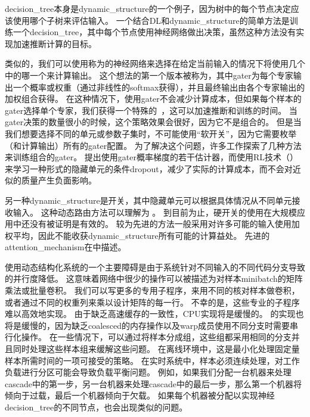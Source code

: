 \gls{decision_tree}本身是\gls{dynamic_structure}的一个例子，因为树中的每个节点决定应该使用哪个子树来评估输入。
一个结合\gls{DL}和\gls{dynamic_structure}的简单方法是训练一个\gls{decision_tree}，其中每个节点使用神经网络做出决策\citep{guo1992classification}，虽然这种方法没有实现加速推断计算的目标。



类似的，我们可以使用称为的神经网络来选择在给定当前输入的情况下将使用几个中的哪一个来计算输出。
这个想法的第一个版本被称为\citep{Nowlan90,Jacobs-nc91}，其中\gls{gater}为每个专家输出一个概率或权重（通过非线性的\gls{softmax}获得），并且最终输出由各个专家输出的加权组合获得。
在这种情况下，使用\gls{gater}不会减少计算成本，但如果每个样本的\gls{gater}选择单个专家，我们获得一个特殊的~\citep{collobert:2001:rr01-12,collobert:2002}，这可以加速推断和训练的时间。
当\gls{gater}决策的数量很小的时候，这个策略效果会很好，因为它不是组合的。
但是当我们想要选择不同的单元或参数子集时，不可能使用``软开关''，因为它需要枚举（和计算输出）所有的\gls{gater}配置。
为了解决这个问题，许多工作探索了几种方法来训练组合的\gls{gater}。
\citet{bengio-arxiv13-condcomp}提出使用\gls{gater}概率梯度的若干估计器，而\citet{Bacon-et-al-RLDM2015,BengioE-et-al-arXiv2015}使用\gls{RL}技术（）来学习一种形式的隐藏单元的条件\gls{dropout}，减少了实际的计算成本，而不会对近似的质量产生负面影响。


另一种\gls{dynamic_structure}是开关，其中隐藏单元可以根据具体情况从不同单元接收输入。
这种动态路由方法可以理解为 \citep{Olshausen1993}。
到目前为止，硬开关的使用在大规模应用中还没有被证明是有效的。
较为先进的方法一般采用对许多可能的输入使用加权平均，因此不能收获\gls{dynamic_structure}所有可能的计算益处。
先进的\gls{attention_mechanism}在中描述。



使用动态结构化系统的一个主要障碍是由于系统针对不同输入的不同代码分支导致的并行度降低。
这意味着网络中很少的操作可以被描述为对样本\gls{minibatch}的矩阵乘法或批量卷积。
我们可以写更多的专用子程序，来用不同的核对样本做卷积，或者通过不同的权重列来乘以设计矩阵的每一行。
不幸的是，这些专业的子程序难以高效地实现。
由于缺乏高速缓存的一致性，CPU实现将是缓慢的。
的实现也将是缓慢的，因为缺乏\gls{coalesced}的内存操作以及\gls{warp}成员使用不同分支时需要串行化操作。
在一些情况下，可以通过将样本分成组，这些组都采用相同的分支并且同时处理这些样本组来缓解这些问题。
在离线环境中，这是最小化处理固定量样本所需时间的一项可接受的策略。
在实时系统中，样本必须连续处理，对工作负载进行分区可能会导致负载平衡问题。
例如，如果我们分配一台机器来处理\gls{cascade}中的第一步，另一台机器来处理\gls{cascade}中的最后一步，那么第一个机器将倾向于过载，最后一个机器倾向于欠载。
如果每个机器被分配以实现神经\gls{decision_tree}的不同节点，也会出现类似的问题。



